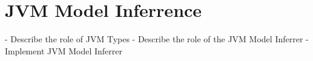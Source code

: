 \section{JVM Model Inferrence}

- Describe the role of JVM Types
- Describe the role of the JVM Model Inferrer
- Implement JVM Model Inferrer
